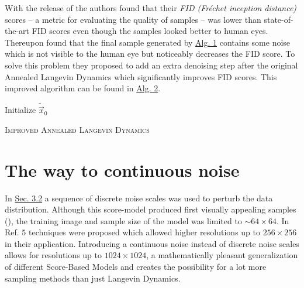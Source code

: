 With the release of \cite{score_1} the authors found that their \textit{FID (Fréchet inception distance)} \cite{fid} scores – a metric for evaluating the quality of samples – was lower than state-of-the-art FID scores even though the samples looked better to human eyes. Thereupon \cite{score_4} found that the final sample generated by \hyperref[alg:1]{Alg. 1} contains some noise which is not visible to the human eye but noticeably decreases the FID score. To solve this problem they proposed to add an extra denoising step after the original Annealed Langevin Dynamics which significantly improves FID scores. This improved algorithm can be found in \hyperref[alg:2]{Alg. 2}.
%
\begin{algorithm} \label{alg:2}
    \DontPrintSemicolon
    Initialize $\tilde{\vec{x}}_0$\;
    
    \caption{\textsc{Improved Annealed Langevin Dynamics}}
\end{algorithm}
\section[The way to continuous noise]{The way to continuous noise%
    } \label{sec:3.3}
In \hyperref[sec:3.2]{Sec. 3.2} a sequence of discrete noise scales was used to perturb the data distribution. Although this score-model produced first visually appealing samples (\cite{score_1}), the training image and sample size of the model was limited to $\sim64\times64$. In Ref. \cite{score_2} $5$ techniques were proposed which allowed higher resolutions up to $256\times256$ in their application. Introducing a continuous noise instead of discrete noise scales allows for resolutions up to $1024\times1024$, a mathematically pleasant generalization of different Score-Based Models and creates the possibility for a lot more sampling methods than just Langevin Dynamics.
%
